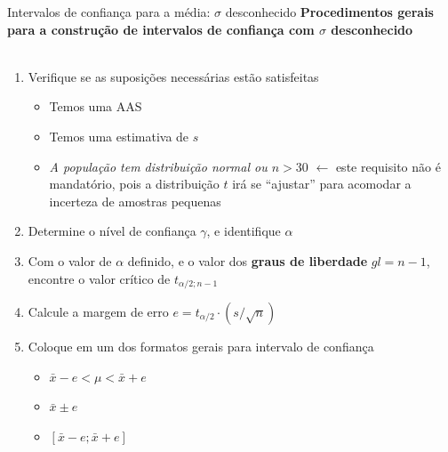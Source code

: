 \documentclass[10pt]{beamer}\usepackage[]{graphicx}\usepackage[]{color}
\theoremstyle{definition}
\begin{document}
\begin{frame}{Intervalos de confiança para a média: $\sigma$ desconhecido}
  \textbf{Procedimentos gerais para a construção de intervalos de
    confiança com $\sigma$ desconhecido}
  \\~\\
  \begin{enumerate}
  \item Verifique se as suposições necessárias estão satisfeitas
    \begin{itemize}
    \item Temos uma AAS
    \item Temos uma estimativa de $s$
    \item \textsl{A população tem distribuição normal ou $n>30$}
      $\leftarrow$ este requisito não é mandatório, pois a distribuição
      $t$ irá se ``ajustar'' para acomodar a incerteza de amostras
      pequenas
    \end{itemize}
  \item Determine o nível de confiança $\gamma$, e identifique $\alpha$
  \item Com o valor de $\alpha$ definido, e o valor dos \textbf{graus de
    liberdade} $gl=n-1$, encontre o valor crítico de $t_{\alpha/2;n-1}$
  \item Calcule a margem de erro $e = t_{\alpha/2} \cdot (s/\sqrt{n})$
  \item Coloque em um dos formatos gerais para intervalo de confiança
    \begin{itemize}
    \item[] $\bar{x} - e < \mu < \bar{x} + e$
    \item[] $\bar{x} \pm e$
    \item[] $[\bar{x} - e; \bar{x} + e]$
    \end{itemize}
  \end{enumerate}
\end{frame}
\end{document}
